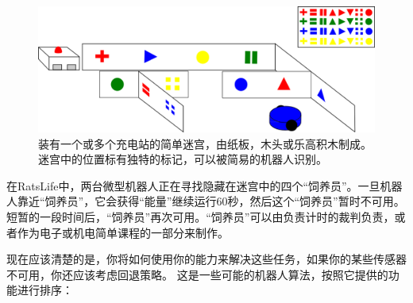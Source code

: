 \begin{figure}
	\centering
		\includegraphics[width=\textwidth]{figs/ratslife.png}
	\caption{装有一个或多个充电站的简单迷宫，由纸板，木头或乐高积木制成。迷宫中的位置标有独特的标记，可以被简易的机器人识别。}
	\label{fig:ratslife}
\end{figure}


在RatsLife中，两台微型机器人正在寻找隐藏在迷宫中的四个“饲养员”。一旦机器人靠近“饲养员”，它会获得“能量”继续运行60秒，然后这个“饲养员”暂时不可用。短暂的一段时间后，“饲养员”再次可用。“饲养员”可以由负责计时的裁判负责，或者作为电子或机电简单课程的一部分来制作。


现在应该清楚的是，你将如何使用你的能力来解决这些任务，如果你的某些传感器不可用，你还应该考虑回退策略。 这是一些可能的机器人算法，按照它提供的功能进行排序：


